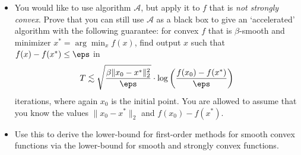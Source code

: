 \documentclass[addpoints,12pt,A4]{exam}
\begin{document}
\begin{questions}
\begin{itemize}
    \item You would like to use algorithm $\mathcal{A}$, but apply it to $f$ that is \emph{not strongly convex}. Prove that you can still use $\mathcal{A}$ as a black box to give an `accelerated' algorithm with the following guarantee: for convex $f$ that is $\beta$-smooth and minimizer $x^{*} = \arg\min_{x} f(x)$, find output $x$ such that $f(x) - f(x^{*}) \leq \eps$ in 
    \[ T \lesssim \sqrt{\frac{\beta \|x_{0} - x^{*}\|_{2}^{2}}{\eps}} \cdot \log \bigg( \frac{f(x_{0}) - f(x^{*})}{\eps} \bigg)   \]
    iterations, where again $x_{0}$ is the initial point. 
    You are allowed to assume that you know the values $\|x_{0} - x^{*}\|_{2}$ and $f(x_{0}) - f(x^{*})$. 

    \item Use this to derive the lower-bound for first-order methods for smooth convex functions via the lower-bound for smooth and strongly convex functions. 
\end{itemize}
\begin{solution}
    
\end{solution}



\end{questions}
\end{document}
